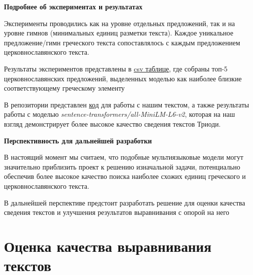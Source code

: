 \documentclass[
  letterpaper,
]{book}
\begin{document}
\begin{tcolorbox}[enhanced jigsaw, toprule=.15mm, colframe=quarto-callout-note-color-frame, colback=white, left=2mm, arc=.35mm, leftrule=.75mm, bottomrule=.15mm, rightrule=.15mm, opacityback=0, breakable]

\textbf{Подробнее об экспериментах и результатах}\vspace{2mm}

Эксперименты проводились как на уровне отдельных предложений, так и на
уровне гимнов (минимальных единиц разметки текста). Каждое уникальное
предложение/гимн греческого текста сопоставлялось с каждым предложением
церковнославянского текста.

Результаты экспериментов представлены в
\href{https://github.com/Drozhzhinastya/GSPC/tree/main/csv/sbert}{csv
таблице}, где собраны топ-5 церковнославянских предложений, выделенных
моделью как наиболее близкие соответствующему греческому элементу

\end{tcolorbox}

В репозитории представлен
\href{https://github.com/Drozhzhinastya/GSPC/blob/main/scripts/text-similarity/GSPC_sbert.ipynb}{код}
для работы с нашим текстом, а также результаты работы с моделью
\emph{sentence-transformers/all-MiniLM-L6-v2}, которая на наш взгляд
демонстрирует более высокое качество сведения текстов Триоди.

\begin{tcolorbox}[enhanced jigsaw, toprule=.15mm, colframe=quarto-callout-tip-color-frame, colback=white, left=2mm, arc=.35mm, leftrule=.75mm, bottomrule=.15mm, rightrule=.15mm, opacityback=0, breakable]

\textbf{Перспективность для дальнейшей разработки}\vspace{2mm}

В настоящий момент мы считаем, что подобные мультиязыковые модели могут
значительно приблизить проект к решению изначальной задачи, потенциально
обеспечив более высокое качество поиска наиболее схожих единиц
греческого и церковнославянского текста.

В дальнейшей перспективе предстоит разработать решение для оценки
качества сведения текстов и улучшения результатов выравнивания с опорой
на него

\end{tcolorbox}


\hypertarget{sec-about_evluation}{%
\chapter{Оценка качества выравнивания
текстов}\label{sec-about_evluation}}
\end{document}
